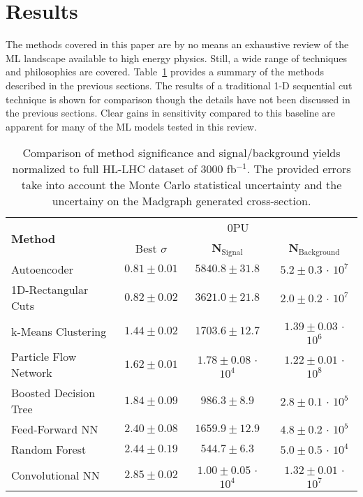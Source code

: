 \section{Results}
\label{sec:results}

The methods covered in this paper are by no means an exhaustive review of the ML landscape available to high energy physics. Still, a wide range of techniques and philosophies are covered. Table~\ref{tab:summary} provides a summary of the methods described in the previous sections. The results of a traditional 1-D sequential cut technique is shown for comparison though the details have not been discussed in the previous sections. Clear gains in sensitivity compared to this baseline are apparent for many of the ML models tested in this review.

\begin{table}[h!]
\label{tab:summary}
  \begin{center}
  \begin{tabular}{|l|c|c|c|} %
      \hline\hline
      \multirow{2}{*}{\textbf{Method}} & \multicolumn{3}{c|}{0PU} \\
      \cline{2-4}
      & Best $\sigma$ & \textbf{N$_{\mathrm{Signal}}$} & \textbf{N$_{\mathrm{Background}}$} \\
      \hline
      Autoencoder           & $0.81 \pm 0.01$ & $5840.8 \pm 31.8$ & $5.2\pm 0.3$ $\cdot$ $10^7$ \\
      1D-Rectangular Cuts   & $0.82 \pm 0.02$ & $3621.0 \pm 21.8$  & $2.0 \pm 0.2$ $\cdot$ $10^7$ \\
      k-Means Clustering    & $1.44 \pm 0.02$ & $1703.6 \pm 12.7$ & $1.39\pm 0.03$  $\cdot$ $10^6$ \\
      Particle Flow Network & $1.62 \pm 0.01$ & $1.78 \pm 0.08$ $\cdot$ $10^4$ & $1.22\pm 0.01$ $\cdot$ $10^8$ \\
      Boosted Decision Tree & $1.84 \pm 0.09$ & $986.3 \pm 8.9$  & $2.8 \pm 0.1$ $\cdot$ $10^5$ \\
      Feed-Forward NN       & $2.40 \pm 0.08$ & $1659.9 \pm 12.9$  & $4.8 \pm 0.2$ $\cdot$ $10^5$ \\
      Random Forest         & $2.44 \pm 0.19$ & $544.7 \pm 6.3$ & $5.0 \pm 0.5$ $\cdot$ $10^4$ \\
      Convolutional NN      & $2.85 \pm 0.02$ & $1.00\pm 0.05$ $\cdot$ $10^4$ & $1.32\pm 0.01$ $\cdot$ $10^7$ \\
      \hline\hline
    \end{tabular}
    \caption{Comparison of method significance and signal/background yields normalized to full HL-LHC dataset of 3000 fb$^{-1}$. The provided errors take into account the Monte Carlo statistical uncertainty and the uncertainy on the Madgraph generated cross-section.}
  \end{center}
\end{table}

